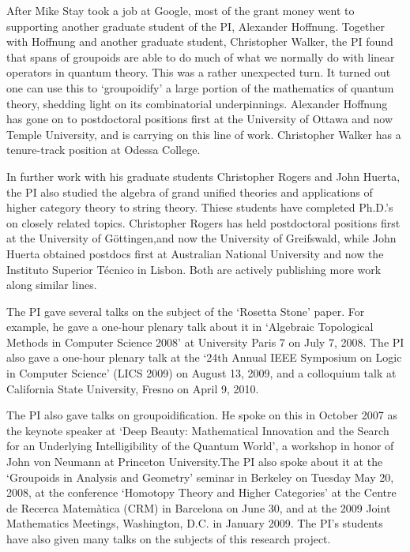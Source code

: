 \documentclass[12pt]{amsart}
\begin{document}
After Mike Stay took a job at Google, most of the grant money went to supporting another graduate student of the PI, Alexander Hoffnung.  Together with Hoffnung and another graduate student, Christopher Walker, the PI found that spans of groupoids are able to do much of what we normally do with linear operators in quantum theory. This was a rather unexpected turn.  It turned out one can use this to `groupoidify' a large portion of the mathematics of quantum theory, shedding light on its combinatorial underpinnings.   Alexander Hoffnung has gone on to postdoctoral positions first at the University of Ottawa and now Temple University, and is carrying on this line of work.  Christopher Walker has a tenure-track position at Odessa College.

In further work with his graduate students Christopher Rogers and John Huerta, the PI also studied the algebra of grand unified theories and applications of higher category theory to string theory.  Thiese students have completed Ph.D.'s on closely related topics.  Christopher Rogers has held postdoctoral positions first at the University of G\"ottingen,and now the University of Greifswald, while John Huerta obtained postdocs first at Australian National University and now the Instituto Superior T\'ecnico in Lisbon.  Both are actively publishing more work along similar lines.

The PI gave several talks on the subject of the `Rosetta Stone' paper. For example, he gave a one-hour plenary talk about it in `Algebraic Topological Methods in Computer Science 2008' at University Paris 7 on July 7, 2008. The PI also gave a one-hour plenary talk at the `24th Annual IEEE Symposium on Logic in Computer Science' (LICS 2009) on August 13, 2009, and a colloquium talk at California State University, Fresno on April 9, 2010. 

The PI also gave talks on groupoidification. He spoke on this in October 2007 as the keynote speaker at `Deep Beauty: Mathematical Innovation and the Search for an Underlying Intelligibility of the Quantum World', a workshop in honor of John von Neumann at Princeton University.The PI also spoke about it at the `Groupoids in Analysis and Geometry' seminar in Berkeley on Tuesday May 20, 2008, at the conference `Homotopy Theory and Higher Categories' at the Centre de Recerca Matem\`atica (CRM) in Barcelona on June 30, and at the 2009 Joint Mathematics Meetings, Washington, D.C. in January 2009.  The PI's students have also given many talks on the subjects of this research project.
\end{document}
